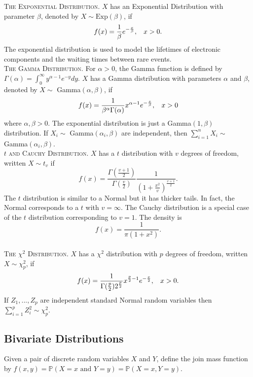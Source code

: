 \documentclass{article}
\theoremstyle{remark}
\newcommand{\1}{\mathbf{1}}
\newcommand{\Prob}{\mathbb{P}}
\begin{document}
\noindent\textsc{The Exponential Distribution}. $X$ has an Exponential Distribution with parameter $\beta$, denoted by $X \sim \text{Exp}(\beta)$, if
\[
f(x) = \frac{1}{\beta} e^{-\frac{x}{\beta}}, \hspace{3mm} x>0.
\]
The exponential distribution is used to model the lifetimes of electronic components and the waiting times between rare events.\\

\noindent\textsc{The Gamma Distribution}. For $\alpha > 0$, the Gamma function is defined by $\Gamma(\alpha) = \int_0^{\infty}y^{\alpha-1}e^{-y} dy$. $X$ has a Gamma distribution with parameters $\alpha$ and $\beta$, denoted by $X \sim$ Gamma$(\alpha,\beta)$, if 
\[
f(x) = \frac{1}{\beta^{\alpha} \Gamma(\alpha)}x^{\alpha-1}e^{-\frac{x}{\beta}}, \hspace{3mm} x > 0
\]
where $\alpha, \beta > 0$. The exponential distribution is just a Gamma$(1,\beta)$ distribution. If $X_i \sim$ Gamma$(\alpha_i, \beta)$ are independent, then $\sum_{i=1}^{n} X_i \sim$ Gamma$(\alpha_i, \beta)$.\\

\noindent\textsc{$t$ and Cauchy Distribution}. $X$ has a $t$ distribution with $v$ degrees of freedom, written $X \sim t_v$ if 
\[
f(x) = \frac{\Gamma(\frac{v+1}{2})}{\Gamma(\frac{v}{2})} \frac{1}{(1 + \frac{x^2}{v})^{\frac{v+1}{2}}}.
\]
The $t$ distribution is similar to a Normal but it has thicker tails. In fact, the Normal corresponds to a $t$ with $v=\infty$. The Cauchy distribution is a special case of the $t$ distribution corresponding to $v =1$. The density is 
\[
f(x) = \frac{1}{\pi(1 + x^2)}.
\]\\

\noindent\textsc{The $\chi^2$ Distribution}. $X$ has a $\chi^2$ distribution with $p$ degrees of freedom, written $X \sim \chi_p^2$, if 
\[
f(x) = \frac{1}{\Gamma(\frac{p}{2})2^{\frac{p}{2}}} x^{\frac{p}{2}-1} e^{-\frac{x}{2}}, \hspace{3mm} x>0.
\]
If $Z_1, ..., Z_p$ are independent standard Normal random variables then $\sum_{i=1}^p Z_i^2 \sim \chi_p^2$.

\subsection{Bivariate Distributions}
Given a pair of discrete random variables $X$ and $Y$, define the join mass function by $f(x,y) = \Prob(X=x \text{ and } Y=y) = \Prob(X=x,Y=y)$. \\
\end{document}
